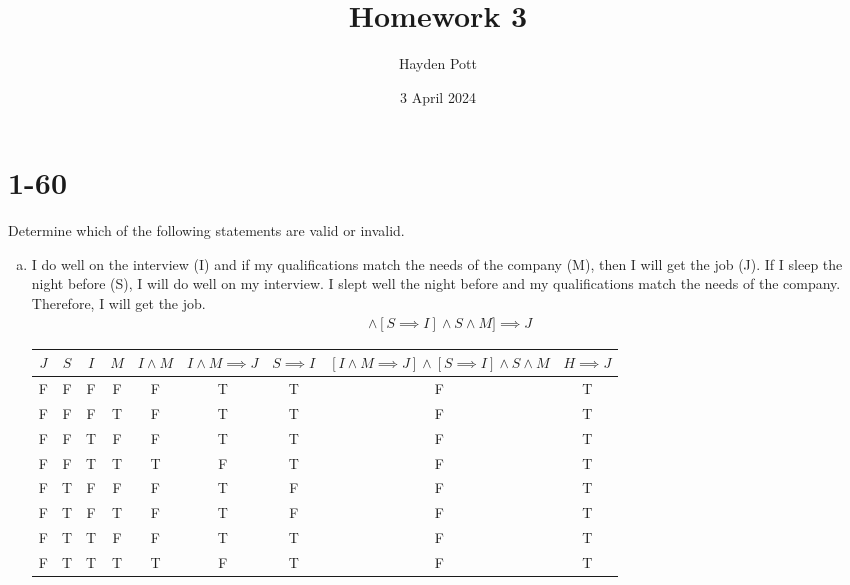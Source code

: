 \documentclass{article}
\begin{document}
\title{Homework 3}
\author{Hayden Pott}
\date{3 April 2024}

\maketitle

\section{1-60}
Determine which of the following statements are valid or invalid.
\begin{enumerate}[a)]

    \item I do well on the interview (I) and if my qualifications match the
        needs of the company (M), then I will get the job (J).  If I sleep
        the night before (S), I will do well on my interview. I slept well
        the night before and my qualifications match the needs of the
        company.  Therefore, I will get the job. \\
        \begin{align*}
            [[I \land M \implies J] \land 
            [S \implies I] \land 
            S \land M] \implies J
        \end{align*}
        \begin{center}
            \begin{tabular}{ |c|c|c|c|c|c|c|c|c| }
                \hline
                $J$ & $S$ & $I$ & $M$ & $I \land M$ & $I \land M \implies J$ & $S \implies I$ & $[I \land M \implies J] \land [S \implies I] \land S \land M$ & $H \implies J$ \\
                \hline
                F & F & F & F & F & T & T & F & T \\
                F & F & F & T & F & T & T & F & T \\
                F & F & T & F & F & T & T & F & T \\
                F & F & T & T & T & F & T & F & T \\
                F & T & F & F & F & T & F & F & T \\
                F & T & F & T & F & T & F & F & T \\
                F & T & T & F & F & T & T & F & T \\
                F & T & T & T & T & F & T & F & T \\


\end{tabular}
\end{center}
\end{enumerate}
\end{document}
